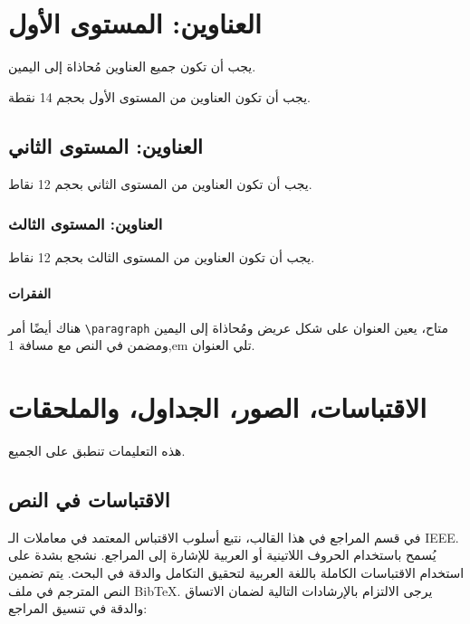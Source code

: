 \documentclass[12pt]{article}
\begin{document}
\section{العناوين: المستوى الأول}
\label{headings}

يجب أن تكون جميع العناوين مُحاذاة إلى اليمين.

يجب أن تكون العناوين من المستوى الأول بحجم 14 نقطة.

\subsection{العناوين: المستوى الثاني}

يجب أن تكون العناوين من المستوى الثاني بحجم 12 نقاط.

\subsubsection{العناوين: المستوى الثالث}

يجب أن تكون العناوين من المستوى الثالث بحجم 12 نقاط.

\paragraph{الفقرات}

هناك أيضًا أمر \verb+\paragraph+ متاح، يعين العنوان على شكل عريض ومُحاذاة إلى اليمين ومضمن في النص مع مسافة 1,em تلي العنوان.

\section{الاقتباسات، الصور، الجداول، والملحقات}
\label{others}

هذه التعليمات تنطبق على الجميع.

\subsection{الاقتباسات في النص}

في قسم المراجع في هذا القالب، نتبع أسلوب الاقتباس المعتمد في معاملات الـ IEEE. يُسمح باستخدام الحروف اللاتينية أو العربية للإشارة إلى المراجع. نشجع بشدة على استخدام الاقتباسات الكاملة باللغة العربية لتحقيق التكامل والدقة في البحث. يتم تضمين النص المترجم في ملف BibTeX. يرجى الالتزام بالإرشادات التالية لضمان الاتساق والدقة في تنسيق المراجع:
\end{document}
